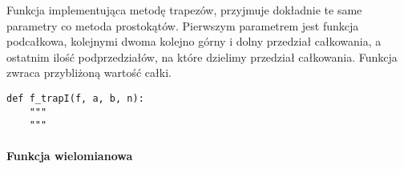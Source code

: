 \documentclass[12pt,twoside]{article}
\begin{document}
Funkcja implementująca metodę trapezów, przyjmuje dokładnie te same parametry co metoda prostokątów. Pierwszym parametrem jest funkcja podcałkowa, kolejnymi dwoma kolejno górny i dolny przedział całkowania, a ostatnim  ilość podprzedziałów, na które dzielimy przedział całkowania. Funkcja zwraca przybliżoną wartość całki.

\begin{lstlisting}[caption={Kod w języku python implementujący metodę trapezów}]
def f_trapI(f, a, b, n):
    """
    """
\end{lstlisting}
\label{Listing 7}

\paragraph{Funkcja wielomianowa}
\end{document}
